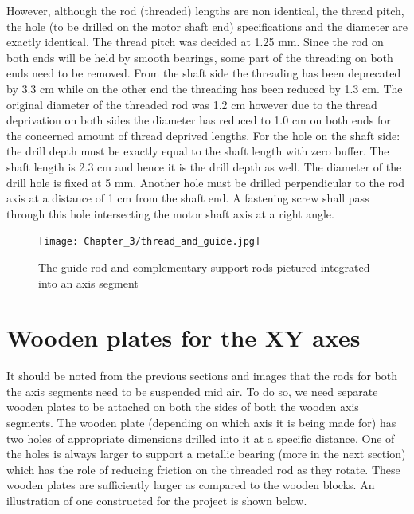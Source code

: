 However, although the rod (threaded) lengths are non identical, the thread pitch, the hole (to be drilled on the motor shaft end) specifications and the diameter are exactly identical. The thread pitch was decided at 1.25 mm. Since the rod on both ends will be held by smooth bearings, some part of the threading on both ends need to be removed. From the shaft side the threading has been deprecated by 3.3 cm while on the other end the threading has been reduced by 1.3 cm. The original diameter of the threaded rod was 1.2 cm however due to the thread deprivation on both sides the diameter has reduced to 1.0 cm on both ends for the concerned amount of thread deprived lengths. For the hole on the shaft side: the drill depth must be exactly equal to the shaft length with zero buffer. The shaft length is 2.3 cm and hence it is the drill depth as well. The diameter of the drill hole is fixed at 5 mm. Another hole must be drilled perpendicular to the rod axis at a distance of 1 cm from the shaft end. A fastening screw shall pass through this hole intersecting the motor shaft axis at a right angle.

\begin{figure}[h]
    \centering
    \texttt{[image: Chapter\_3/thread\_and\_guide.jpg]}
    \caption{The guide rod and complementary support rods pictured integrated into an axis segment }
    \label{fig:xy_rods}
\end{figure}


\section{Wooden plates for the XY axes}

It should be noted from the previous sections and images that the rods for both the axis segments need to be suspended mid air. To do so, we need separate wooden plates to be attached on both the sides of both the wooden axis segments. The wooden plate (depending on which axis it is being made for) has two holes of appropriate dimensions drilled into it at a specific distance. One of the holes is always larger to support a metallic bearing (more in the next section) which has the role of reducing friction on the threaded rod as they rotate. These wooden plates are sufficiently larger as compared to the wooden blocks. An illustration of one constructed for the project is shown below.


